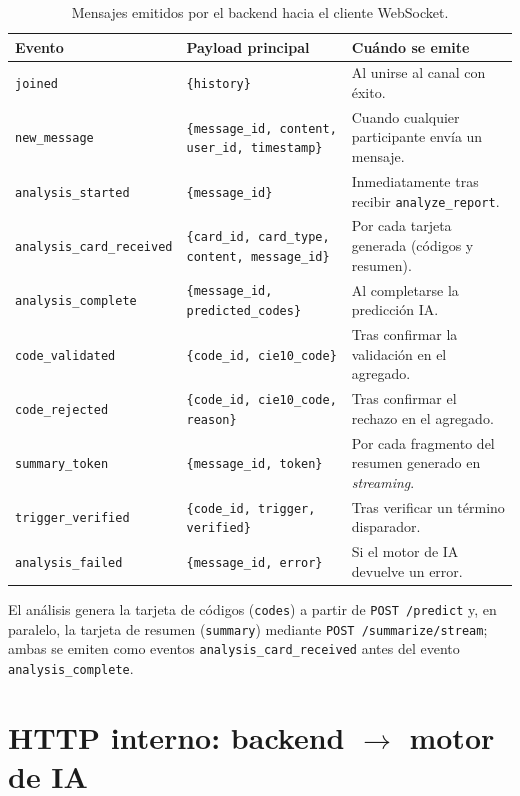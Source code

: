 \begin{table}[h]
\centering
\caption{Mensajes emitidos por el backend hacia el cliente WebSocket.}
\label{tab:ws-out}
\begin{tabular}{lp{4.5cm}p{5cm}}
\hline
\textbf{Evento} & \textbf{Payload principal} & \textbf{Cuándo se emite} \\
\hline
\texttt{joined} & \texttt{\{history\}} & Al unirse al canal con éxito. \\
\texttt{new\_message} & \texttt{\{message\_id, content, user\_id, timestamp\}} & Cuando cualquier participante envía un mensaje. \\
\texttt{analysis\_started} & \texttt{\{message\_id\}} & Inmediatamente tras recibir \texttt{analyze\_report}. \\
\texttt{analysis\_card\_received}& \texttt{\{card\_id, card\_type, content, message\_id\}} & Por cada tarjeta generada (códigos y resumen). \\
\texttt{analysis\_complete} & \texttt{\{message\_id, predicted\_codes\}} & Al completarse la predicción IA. \\
\texttt{code\_validated} & \texttt{\{code\_id, cie10\_code\}} & Tras confirmar la validación en el agregado. \\
\texttt{code\_rejected} & \texttt{\{code\_id, cie10\_code, reason\}} & Tras confirmar el rechazo en el agregado. \\
\texttt{summary\_token} & \texttt{\{message\_id, token\}} & Por cada fragmento del resumen generado en \emph{streaming}. \\
\texttt{trigger\_verified} & \texttt{\{code\_id, trigger, verified\}} & Tras verificar un término disparador. \\
\texttt{analysis\_failed} & \texttt{\{message\_id, error\}} & Si el motor de IA devuelve un error. \\
\hline
\end{tabular}
\end{table}

El análisis genera la tarjeta de códigos (\texttt{codes}) a partir de \texttt{POST /predict} y, en paralelo, la tarjeta de resumen (\texttt{summary}) mediante \texttt{POST /summarize/stream}; ambas se emiten como eventos \texttt{analysis\_card\_received} antes del evento \texttt{analysis\_complete}.

\section{HTTP interno: backend \texorpdfstring{$\rightarrow$}{->} motor de IA}


